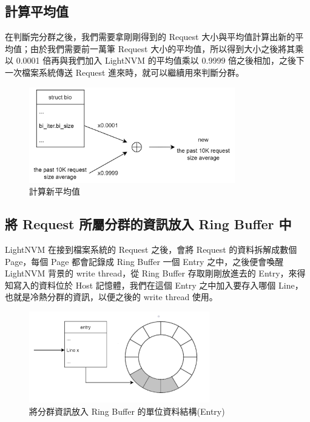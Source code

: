 \subsection{計算平均值}\label{s3.2.3}
\indent
在判斷完分群之後，我們需要拿剛剛得到的 Request 大小與平均值計算出新的平均值；由於我們需要前一萬筆 Request 大小的平均值，所以得到大小之後將其乘以 0.0001 倍再與我們加入 LightNVM 的平均值乘以 0.9999 倍之後相加，之後下一次檔案系統傳送 Request 進來時，就可以繼續用來判斷分群。
\begin{figure}[H]
    \centering
    \includegraphics[width=0.8\textwidth]{picture/ch3/new_average.png}
    \caption{計算新平均值}
    \label{f3.4}
\end{figure}

\subsection{將 Request 所屬分群的資訊放入 Ring Buffer 中}\label{s3.2.4}
\indent
LightNVM 在接到檔案系統的 Request 之後，會將 Request 的資料拆解成數個 Page，每個 Page 都會記錄成 Ring Buffer 一個 Entry 之中，之後便會喚醒 LightNVM 背景的 write thread，從 Ring Buffer 存取剛剛放進去的 Entry，來得知寫入的資料位於 Host 記憶體，我們在這個 Entry 之中加入要存入哪個 Line，也就是冷熱分群的資訊，以便之後的 write thread 使用。

\begin{figure}[H]
    \centering
    \includegraphics[width=0.7\textwidth]{picture/ch3/store_line_in_ring_buffer_entry.png}
    \caption{將分群資訊放入 Ring Buffer 的單位資料結構(Entry)}
    \label{f3.5}
\end{figure}

